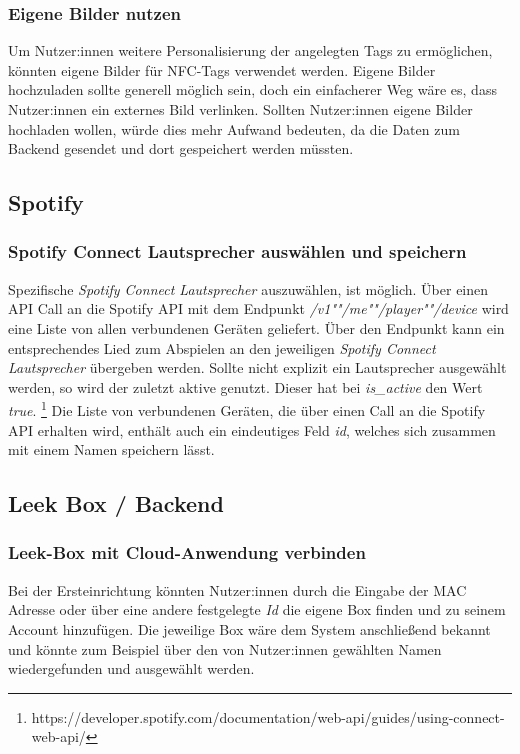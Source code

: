 \documentclass[10pt, a4paper]{article}
\begin{document}
\begin{onehalfspace}
\subsubsection*{Eigene Bilder nutzen}
Um Nutzer:innen weitere Personalisierung der angelegten Tags zu ermöglichen, könnten eigene Bilder für NFC-Tags verwendet werden.
Eigene Bilder hochzuladen sollte generell möglich sein, doch ein einfacherer Weg wäre es, dass Nutzer:innen ein externes Bild verlinken.
Sollten Nutzer:innen eigene Bilder hochladen wollen, würde dies mehr Aufwand bedeuten, da die Daten zum Backend gesendet und dort gespeichert werden müssten.

\subsection{Spotify}
\subsubsection*{Spotify Connect Lautsprecher auswählen und speichern}
Spezifische \textit{Spotify Connect Lautsprecher} auszuwählen, ist möglich.
Über einen API Call an die Spotify API mit dem Endpunkt \textit{/v1""/me""/player""/device} wird eine Liste von allen verbundenen Geräten geliefert. Über den Endpunkt kann ein entsprechendes Lied zum Abspielen an den jeweiligen \textit{Spotify Connect Lautsprecher} übergeben werden.
Sollte nicht explizit ein Lautsprecher ausgewählt werden, so wird der zuletzt aktive genutzt. Dieser hat bei \textit{is\_active} den Wert \textit{true}. \footnote{https://developer.spotify.com/documentation/web-api/guides/using-connect-web-api/}
Die Liste von verbundenen Geräten, die über einen Call an die Spotify API erhalten wird, enthält auch ein eindeutiges Feld \textit{id}, welches sich zusammen mit einem Namen speichern lässt.

\subsection{Leek Box / Backend}
\subsubsection*{Leek-Box mit Cloud-Anwendung verbinden}
Bei der Ersteinrichtung könnten Nutzer:innen durch die Eingabe der MAC Adresse oder über eine andere festgelegte \textit{Id} die eigene Box finden und zu seinem Account hinzufügen.
Die jeweilige Box wäre dem System anschließend bekannt und könnte zum Beispiel über den von Nutzer:innen gewählten Namen wiedergefunden und ausgewählt werden.


\end{onehalfspace}
\end{document}
